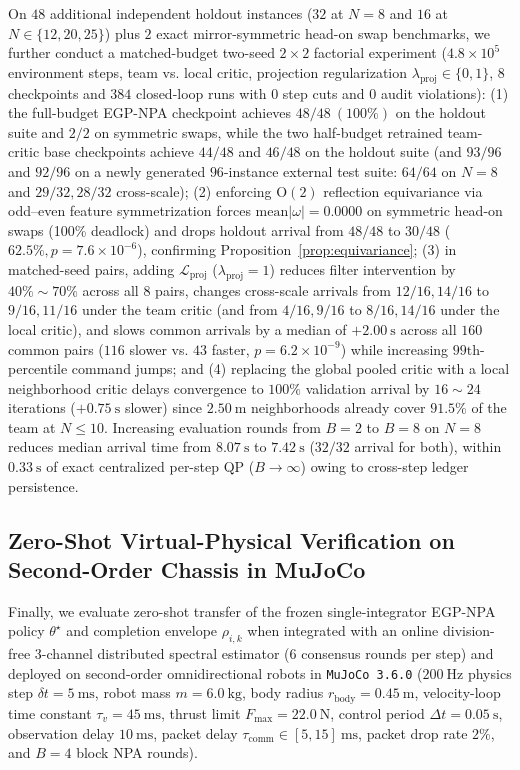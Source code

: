 On $48$ additional independent holdout instances ($32$ at $N=8$ and $16$ at $N\in\{12,20,25\}$) plus $2$ exact mirror-symmetric head-on swap benchmarks, we further conduct a matched-budget two-seed $2\times 2$ factorial experiment ($4.8\times 10^5$ environment steps, team vs. local critic, projection regularization $\lambda_{\mathrm{proj}}\in\{0,1\}$, $8$ checkpoints and $384$ closed-loop runs with $0$ step cuts and $0$ audit violations): (1) the full-budget EGP-NPA checkpoint achieves $48/48\ (100\%)$ on the holdout suite and $2/2$ on symmetric swaps, while the two half-budget retrained team-critic base checkpoints achieve $44/48$ and $46/48$ on the holdout suite (and $93/96$ and $92/96$ on a newly generated $96$-instance external test suite: $64/64$ on $N=8$ and $29/32,28/32$ cross-scale); (2) enforcing $\mathrm{O}(2)$ reflection equivariance via odd--even feature symmetrization forces $\mathrm{mean}|\omega|=0.0000$ on symmetric head-on swaps (100\% deadlock) and drops holdout arrival from $48/48$ to $30/48$ ($62.5\%,p=7.6\times 10^{-6}$), confirming Proposition~\ref{prop:equivariance}; (3) in matched-seed pairs, adding $\mathcal L_{\mathrm{proj}}$ ($\lambda_{\mathrm{proj}}=1$) reduces filter intervention by $40\%\sim 70\%$ across all $8$ pairs, changes cross-scale arrivals from $12/16,14/16$ to $9/16,11/16$ under the team critic (and from $4/16,9/16$ to $8/16,14/16$ under the local critic), and slows common arrivals by a median of $+2.00\ \mathrm s$ across all $160$ common pairs ($116$ slower vs. $43$ faster, $p=6.2\times 10^{-9}$) while increasing $99\text{th}$-percentile command jumps; and (4) replacing the global pooled critic with a local neighborhood critic delays convergence to $100\%$ validation arrival by $16\sim 24$ iterations ($+0.75\ \mathrm s$ slower) since $2.50\ \mathrm m$ neighborhoods already cover $91.5\%$ of the team at $N\le 10$. Increasing evaluation rounds from $B=2$ to $B=8$ on $N=8$ reduces median arrival time from $8.07\ \mathrm s$ to $7.42\ \mathrm s$ ($32/32$ arrival for both), within $0.33\ \mathrm s$ of exact centralized per-step QP ($B\to\infty$) owing to cross-step ledger persistence.

\subsection{Zero-Shot Virtual-Physical Verification on Second-Order Chassis in MuJoCo}\label{subsec:mujoco}
Finally, we evaluate zero-shot transfer of the frozen single-integrator EGP-NPA policy $\theta^\star$ and completion envelope $\rho_{i,k}$ when integrated with an online division-free 3-channel distributed spectral estimator ($6$ consensus rounds per step) and deployed on second-order omnidirectional robots in \texttt{MuJoCo 3.6.0} ($200\ \mathrm{Hz}$ physics step $\delta t=5\ \mathrm{ms}$, robot mass $m=6.0\ \mathrm{kg}$, body radius $r_{\mathrm{body}}=0.45\ \mathrm m$, velocity-loop time constant $\tau_v=45\ \mathrm{ms}$, thrust limit $F_{\max}=22.0\ \mathrm N$, control period $\Delta t=0.05\ \mathrm s$, observation delay $10\ \mathrm{ms}$, packet delay $\tau_{\mathrm{comm}}\in[5,15]\ \mathrm{ms}$, packet drop rate $2\%$, and $B=4$ block NPA rounds).


